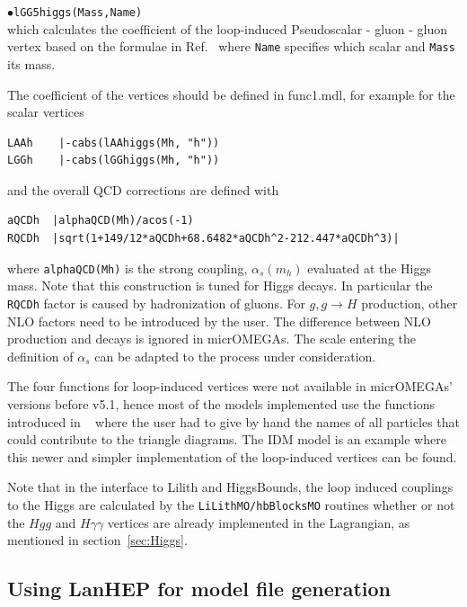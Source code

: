 \documentclass[12pt,a4paper]{article}
\begin{document}
\noindent
$\bullet$\verb|lGG5higgs(Mass,Name)|\\
which calculates the coefficient of the loop-induced  Pseudoscalar - gluon - gluon  vertex based on the formulae in Ref.~\cite{Djouadi:2005gi} where {\tt Name} specifies which scalar and {\tt Mass} its mass. 


The coefficient of the vertices should be defined in func1.mdl, for example for the scalar vertices
 \begin{verbatim}
LAAh    |-cabs(lAAhiggs(Mh, "h"))
LGGh    |-cabs(lGGhiggs(Mh, "h"))
\end{verbatim}
and the overall QCD corrections are defined with 

 \begin{verbatim}
aQCDh  |alphaQCD(Mh)/acos(-1)
RQCDh  |sqrt(1+149/12*aQCDh+68.6482*aQCDh^2-212.447*aQCDh^3)|
\end{verbatim}
where {\tt alphaQCD(Mh)} is the strong coupling, $\alpha_s(m_h)$ evaluated at the Higgs mass. Note that this construction is tuned for  Higgs decays. In particular the   \verb|RQCDh|  factor is caused by hadronization of gluons.   For $g,g\to H$ production, other NLO factors need to be introduced by the user. The difference between NLO production and decays is ignored in micrOMEGAs.  The scale entering the definition of $\alpha_s$ can be adapted to the process under consideration. 

The four functions for loop-induced vertices were not available in micrOMEGAs' versions before v5.1, hence most of the models implemented use the functions introduced in ~\cite{Belanger:2013oya} where the user had to give by hand the names of all particles that could contribute to the triangle diagrams. The IDM model is an example where this newer and simpler implementation of the loop-induced vertices can be found. 

Note that in the interface to Lilith and HiggsBounds, the loop induced couplings to the Higgs  are calculated by the {\tt LiLithMO/hbBlocksMO}  routines whether or not the $Hgg$ and $H\gamma\gamma$ vertices are already implemented in the Lagrangian, as mentioned in section~\ref{sec:Higgs}. 


\subsection{Using LanHEP for model file generation}
\end{document}
